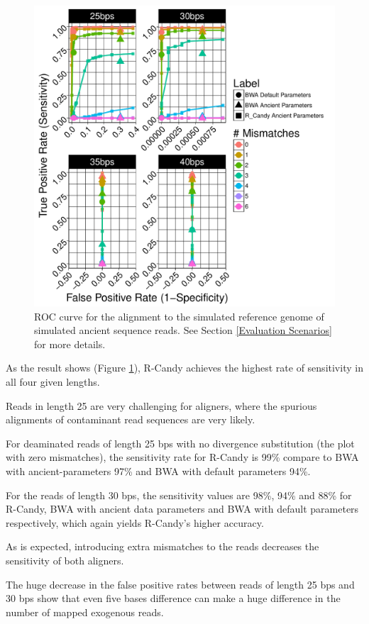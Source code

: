 \documentclass[11pt,a4paper]{report}
\begin{document}
\begin{figure}[H]
\centering
\includegraphics[width=12cm]{pictures/f_DS1_emp.pdf}

\caption{
ROC curve for the alignment to the simulated reference genome of simulated ancient
sequence reads. See Section \ref{Evaluation Scenarios} for more details.}
\label{DS1_emp}
\end{figure}


As the result shows (Figure \ref{DS1_emp}), R-Candy achieves the highest rate of
sensitivity in all four given lengths.

Reads in length 25 are very challenging for aligners, where the spurious 
alignments of contaminant read sequences are very likely.

For deaminated reads of length 25 bps with no divergence substitution (the plot
with zero mismatches), the sensitivity rate for R-Candy is 99\% compare to BWA 
with ancient-parameters 97\% and BWA with default parameters 94\%. 


For the reads of length 30 bps, the sensitivity values are 98\%, 94\% and 88\%
for R-Candy, BWA with ancient data parameters and BWA with default parameters
respectively, which again yields R-Candy's higher accuracy.

As is expected, introducing extra mismatches to the reads decreases  
the sensitivity of both aligners.

The huge decrease in the false positive rates between reads of length 25 bps and
30 bps show that even five bases difference can make a huge difference in the 
number of mapped exogenous reads.
\end{document}
